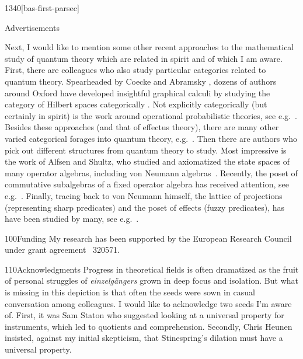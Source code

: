\begin{parsec}{1340}[bas-first-parsec]
\begin{point}{80}{Advertisements}
\begin{point}{90}%
Next, I would like to mention some other recent approaches
    to the mathematical study of quantum theory
        which are related in spirit and of which I am aware.
First, there are colleagues who also study particular categories
    related to quantum theory.
Spearheaded by Coecke and Abramsky \cite{abramsky2004categorical},
    dozens of authors around Oxford
    have developed insightful graphical calculi
    by studying the category of Hilbert spaces
    categorically \cite{coecke2017picturing}.
Not explicitly categorically (but certainly in spirit)
    is the work around operational probabilistic theories,
    see e.g.~\cite{DAriano2016}.
Besides these approaches (and that of effectus theory),
    there are many other varied categorical forages
    into quantum theory, e.g.~\cite{kornell2012,rennela2017infinite,staton,furber2013kleisli}.
Then there are authors who pick out different structures from quantum theory
    to study.
Most impressive is the work of Alfsen and Shultz,
    who studied and axiomatized the state
    spaces of many operator algebras, including von Neumann algebras~\cite{alfsen2012}.
Recently, the poset of commutative subalgebras of a fixed operator algebra
    has received attention,
    see e.g.~\cite{heunen2015domains,bert,heunen2012bohrification}.
Finally,
    tracing back to von Neumann himself,
    the lattice of projections (representing sharp predicates)
    and the poset of effects (fuzzy predicates),
    has have been studied by many, see e.g.~\cite{dvurecenskij2013new}.
\end{point}
\end{point}
\begin{point}{100}{Funding}
My research has been supported by the
European Research Council under grant agreement \textnumero~320571.
\end{point}
\begin{point}{110}{Acknowledgments}%
Progress in theoretical fields
    is often dramatized
    as the fruit of personal struggles of  \emph{einzelg\"angers}
    grown in deep focus and isolation.
But what is missing in this depiction is that
    often the seeds were sown
    in casual conversation among colleagues.
I would like to acknowledge two seeds I'm aware of.
First, it was Sam Staton who suggested looking at a universal property
    for instruments, which led to quotients and comprehension.
Secondly, Chris Heunen insisted,
    against my initial skepticism,
    that Stinespring's dilation must have a
    universal property.

\end{point}
\end{parsec}
